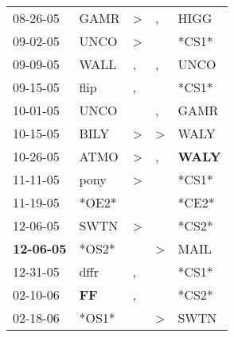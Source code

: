 \begin{supertabular}{p{0.07\textwidth}p{0.06\textwidth}p{0.02\textwidth}p{0.02\textwidth}p{0.06\textwidth}}
          08-26-05\textsuperscript{} &           GAMR\textsuperscript{} &     \textgreater &                , &           HIGG\textsuperscript{} \\
          09-02-05\textsuperscript{} &           UNCO\textsuperscript{} &     \textgreater &                  &                            *CS1* \\
          09-09-05\textsuperscript{} &           WALL\textsuperscript{} &                , &                , &           UNCO\textsuperscript{} \\
          09-15-05\textsuperscript{} &           flip\textsuperscript{} &                , &                  &                            *CS1* \\
          10-01-05\textsuperscript{} &           UNCO\textsuperscript{} &                  &                , &           GAMR\textsuperscript{} \\
          10-15-05\textsuperscript{} &           BILY\textsuperscript{} &     \textgreater &     \textgreater &           WALY\textsuperscript{} \\
          10-26-05\textsuperscript{} &           ATMO\textsuperscript{} &     \textgreater &                , &  \textbf{WALY\textsuperscript{}} \\
          11-11-05\textsuperscript{} &           pony\textsuperscript{} &     \textgreater &                  &                            *CS1* \\
          11-19-05\textsuperscript{} &                            *OE2* &                  &                  &                            *CE2* \\
          12-06-05\textsuperscript{} &           SWTN\textsuperscript{} &     \textgreater &                  &                            *CS2* \\
 \textbf{12-06-05\textsuperscript{}} &                            *OS2* &                  &     \textgreater &           MAIL\textsuperscript{} \\
          12-31-05\textsuperscript{} &           dffr\textsuperscript{} &                , &                  &                            *CS1* \\
          02-10-06\textsuperscript{} &    \textbf{FF\textsuperscript{}} &                , &                  &                            *CS2* \\
          02-18-06\textsuperscript{} &                            *OS1* &                  &     \textgreater &           SWTN\textsuperscript{} \\

\end{supertabular}
